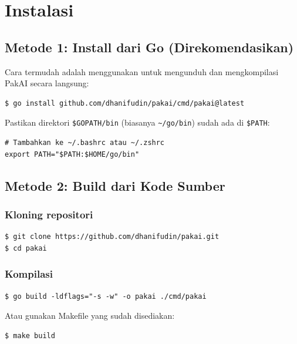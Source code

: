 \chapter{Instalasi}

\section{Metode 1: Install dari Go (Direkomendasikan)}

Cara termudah adalah menggunakan  untuk mengunduh dan mengkompilasi
PakAI secara langsung:

\begin{lstlisting}[style=terminal]
$ go install github.com/dhanifudin/pakai/cmd/pakai@latest
\end{lstlisting}

Pastikan direktori \texttt{\$GOPATH/bin} (biasanya \texttt{\textasciitilde/go/bin})
sudah ada di \texttt{\$PATH}:

\begin{lstlisting}[style=terminal]
# Tambahkan ke ~/.bashrc atau ~/.zshrc
export PATH="$PATH:$HOME/go/bin"
\end{lstlisting}

\section{Metode 2: Build dari Kode Sumber}

\subsection{Kloning repositori}

\begin{lstlisting}[style=terminal]
$ git clone https://github.com/dhanifudin/pakai.git
$ cd pakai
\end{lstlisting}

\subsection{Kompilasi}

\begin{lstlisting}[style=terminal]
$ go build -ldflags="-s -w" -o pakai ./cmd/pakai
\end{lstlisting}

Atau gunakan Makefile yang sudah disediakan:

\begin{lstlisting}[style=terminal]
$ make build
\end{lstlisting}

